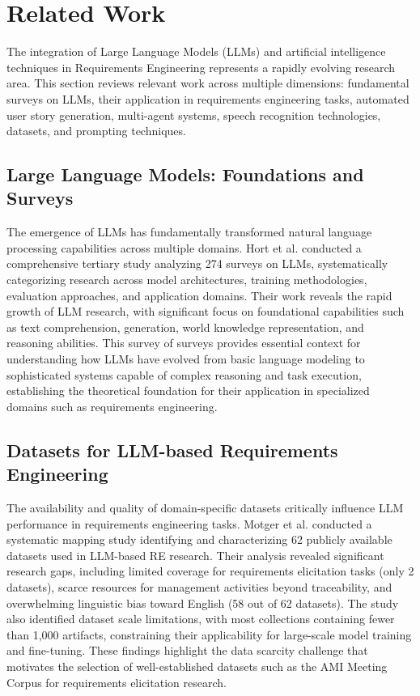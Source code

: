 \documentclass[12pt]{article}
\begin{document}
\section{Related Work}
\label{sec:related}

The integration of Large Language Models (LLMs) and artificial intelligence techniques in Requirements Engineering represents a rapidly evolving research area. This section reviews relevant work across multiple dimensions: fundamental surveys on LLMs, their application in requirements engineering tasks, automated user story generation, multi-agent systems, speech recognition technologies, datasets, and prompting techniques.

\subsection{Large Language Models: Foundations and Surveys}

The emergence of LLMs has fundamentally transformed natural language processing capabilities across multiple domains. Hort et al. \cite{hort:hal-05341748} conducted a comprehensive tertiary study analyzing 274 surveys on LLMs, systematically categorizing research across model architectures, training methodologies, evaluation approaches, and application domains. Their work reveals the rapid growth of LLM research, with significant focus on foundational capabilities such as text comprehension, generation, world knowledge representation, and reasoning abilities. This survey of surveys provides essential context for understanding how LLMs have evolved from basic language modeling to sophisticated systems capable of complex reasoning and task execution, establishing the theoretical foundation for their application in specialized domains such as requirements engineering.

\subsection{Datasets for LLM-based Requirements Engineering}

The availability and quality of domain-specific datasets critically influence LLM performance in requirements engineering tasks. Motger et al. \cite{motger2025share} conducted a systematic mapping study identifying and characterizing 62 publicly available datasets used in LLM-based RE research. Their analysis revealed significant research gaps, including limited coverage for requirements elicitation tasks (only 2 datasets), scarce resources for management activities beyond traceability, and overwhelming linguistic bias toward English (58 out of 62 datasets). The study also identified dataset scale limitations, with most collections containing fewer than 1,000 artifacts, constraining their applicability for large-scale model training and fine-tuning. These findings highlight the data scarcity challenge that motivates the selection of well-established datasets such as the AMI Meeting Corpus \cite{ami_dataset} for requirements elicitation research.
\end{document}
